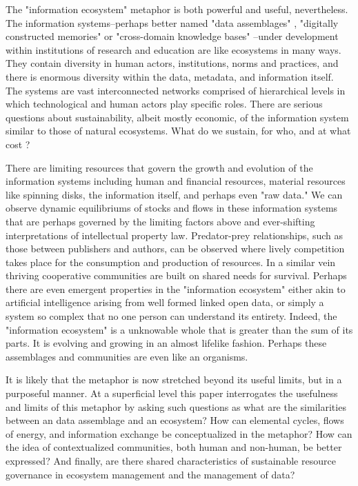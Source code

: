 The "information ecosystem" metaphor is both powerful and useful, nevertheless. The information systems--perhaps better named "data assemblages" \citep{kitchin_2014}, "digitally constructed memories" or "cross-domain knowledge bases" \citep{baker_2007}--under development within institutions of research and education are like ecosystems in many ways. They contain diversity in human actors, institutions, norms and practices, and there is enormous diversity within the data, metadata, and information itself. The systems are vast interconnected networks comprised of hierarchical levels in which technological and human actors play specific roles. There are serious questions about sustainability, albeit mostly economic, of the information system similar to those of natural ecosystems. What do we sustain, for who, and at what cost \citep[cf.][especially ch. 10]{merenlender_2004,liverman_2004,kitchin_2014}? 

There are limiting resources that govern the growth and evolution of the information systems including human and financial resources, material resources like spinning disks, the information itself, and perhaps even "raw data." We can observe dynamic equilibriums of stocks and flows in these information systems that are perhaps governed by the limiting factors above and ever-shifting interpretations of intellectual property law. Predator-prey relationships, such as those between publishers and authors, can be observed where lively competition takes place for the consumption and production of resources. In a similar vein thriving cooperative communities are built on shared needs for survival. Perhaps there are even emergent properties in the "information ecosystem" either akin to artificial intelligence arising from well formed linked open data, or simply a system so complex that no one person can understand its entirety. Indeed, the "information ecosystem" is a unknowable whole that is greater than the sum of its parts. It is evolving and growing in an almost lifelike fashion. Perhaps these assemblages and communities are even like an organisms.

It is likely that the metaphor is now stretched beyond its useful limits, but in a purposeful manner. At a superficial level this paper interrogates the usefulness and limits of this metaphor by asking such questions as what are the similarities between an data assemblage and an ecosystem? How can elemental cycles, flows of energy, and information exchange be conceptualized in the metaphor? How can the idea of contextualized communities, both human and non-human, be better expressed? And finally, are there shared characteristics of sustainable resource governance in ecosystem management and the management of data? 

